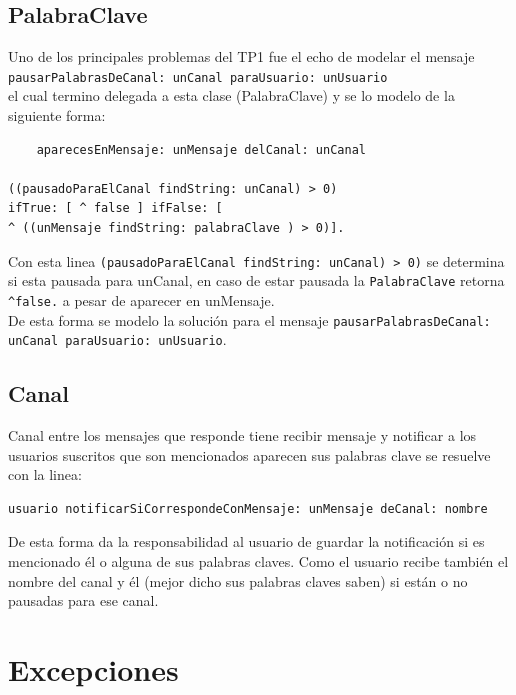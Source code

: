 \documentclass[titlepage,a4paper]{article}
\begin{document}
\subsection{PalabraClave} Uno de los principales problemas del TP1 fue el echo de modelar el mensaje\\ \verb|pausarPalabrasDeCanal: unCanal paraUsuario: unUsuario|\\ el cual termino delegada a esta clase (PalabraClave) y se lo modelo de la siguiente forma:
\begin{verbatim}
    aparecesEnMensaje: unMensaje delCanal: unCanal

((pausadoParaElCanal findString: unCanal) > 0)
ifTrue: [ ^ false ] ifFalse: [
^ ((unMensaje findString: palabraClave ) > 0)].
\end{verbatim}
Con esta linea \verb|(pausadoParaElCanal findString: unCanal) > 0)| se determina si esta pausada para unCanal, en caso de estar pausada la \verb|PalabraClave| retorna \verb|^false.| a pesar de aparecer en unMensaje.\\ De esta forma se modelo la solución para el mensaje \verb|pausarPalabrasDeCanal: unCanal paraUsuario: unUsuario|.
\subsection{Canal} Canal entre los mensajes que responde tiene recibir mensaje y notificar a los usuarios suscritos que son mencionados aparecen sus palabras clave se resuelve con la linea:
\begin{verbatim}
usuario notificarSiCorrespondeConMensaje: unMensaje deCanal: nombre
\end{verbatim}

De esta forma da la responsabilidad al usuario de guardar la notificación si es mencionado él o alguna de sus palabras claves. Como el usuario recibe también el nombre del canal y él (mejor dicho sus palabras claves saben) si están o no pausadas para ese canal.



\section{Excepciones}\label{sec:excepciones}
\end{document}
